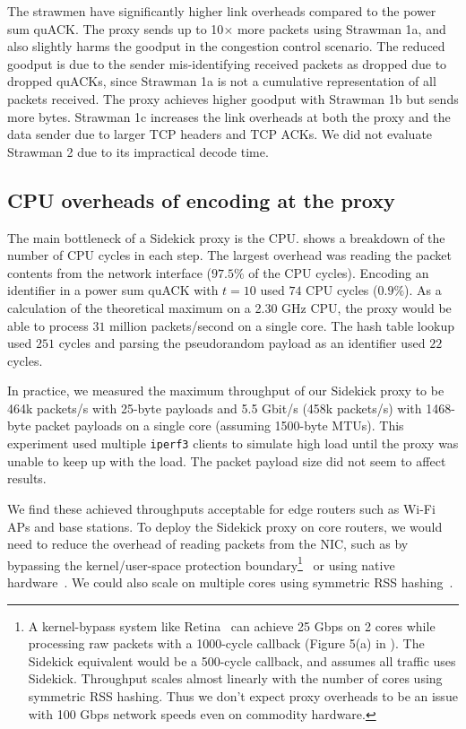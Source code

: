 The strawmen have significantly higher link overheads compared to the power sum
quACK\@. The proxy sends up to 10$\times$ more packets using Strawman 1a, and
also slightly harms the goodput in the congestion control scenario.
The reduced goodput is due to the sender mis-identifying received packets as
dropped due to dropped quACKs, since Strawman 1a is not a cumulative
representation of all packets received.
The proxy achieves higher goodput with Strawman 1b but sends
more bytes. Strawman 1c increases the link overheads at both the proxy and the
data sender due to larger TCP headers and TCP ACKs.
We did not evaluate Strawman 2 due to its impractical decode time.

\subsection{CPU overheads of encoding at the proxy}
\label{sec:sidekick:emulation:cpu-overheads}



The main bottleneck of a Sidekick proxy is the CPU\@.
 shows a breakdown of the number of CPU cycles
in each step. The largest overhead was reading the packet contents from the
network interface ($97.5\%$ of the CPU cycles).
Encoding an identifier in a power sum quACK with $t=10$ used $74$ CPU
cycles ($0.9\%$). As a calculation of the theoretical maximum on a 2.30 GHz
CPU, the proxy would be able to process $31$ million packets/second on a single
core. The hash table lookup used $251$ cycles and parsing the pseudorandom
payload as an identifier used $22$ cycles.

In practice, we measured the maximum throughput of our Sidekick proxy to
be 464k packets/s with 25-byte payloads and 5.5 Gbit/s (458k packets/s) with
1468-byte packet payloads on a single core (assuming 1500-byte MTUs).
This experiment used multiple \texttt{iperf3} clients to simulate high
load until the proxy was unable to keep up with the load.
The packet payload size did not seem to affect results.

We find these achieved throughputs acceptable for edge routers such as Wi-Fi APs
and base stations. To deploy the Sidekick proxy on core routers, we would need
to reduce the overhead of reading packets from the NIC, such as by bypassing
the kernel/user-space protection boundary\footnote{ A kernel-bypass system like
Retina~\cite{wan2022retina} can achieve 25 Gbps on 2 cores while processing raw
packets with a 1000-cycle callback (Figure 5(a) in \cite{wan2022retina}). The
Sidekick equivalent would be a 500-cycle callback, and assumes all traffic uses
Sidekick. Throughput scales almost linearly with the number of
cores using symmetric RSS hashing. Thus we don't expect proxy overheads to be
an issue with 100 Gbps network speeds
even on commodity hardware. }~\cite{dpdk,mccanne1993bsd,wan2022retina} or using
native hardware~\cite{bosshart2014p4}. We could also scale on multiple cores
using symmetric RSS hashing~\cite{woo2012scalable}.

